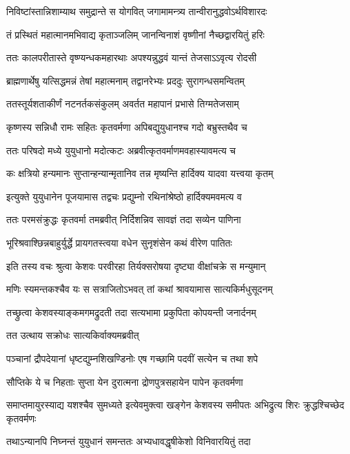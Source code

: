 \twolineshloka
{निविष्टांस्तान्निशाम्याथ समुद्रान्ते स योगवित्}
{जगामामन्त्र्य तान्वीरानुद्धवोऽर्थविशारदः}


\twolineshloka
{तं प्रस्थितं महात्मानमभिवाद्य कृताञ्जलिम्}
{जानन्विनाशं वृष्णीनां नैच्छद्वारयितुं हरिः}


\twolineshloka
{ततः कालपरीतास्ते वृष्ण्यन्धकमहारथाः}
{अपश्यन्नुद्धवं यान्तं तेजसाऽऽवृत्य रोदसी}


\twolineshloka
{ब्राह्मणार्थेषु यत्सिद्धमन्नं तेषां महात्मनाम्}
{तद्वानरेभ्यः प्रददुः सुरागन्धसमन्वितम्}


\twolineshloka
{ततस्तूर्यशताकीर्णं नटनर्तकसंकुलम्}
{अवर्तत महापानं प्रभासे तिग्मतेजसाम्}


\twolineshloka
{कृष्णस्य सन्निधौ रामः सहितः कृतवर्मणा}
{अपिबद्युयुधानश्च गदो बभ्रुस्तथैव च}


\twolineshloka
{ततः परिषदो मध्ये युयुधानो मदोत्कटः}
{अब्रवीत्कृतवर्माणमवहास्यावमत्य च}


\twolineshloka
{कः क्षत्रियो हन्यमानः सुप्तान्हन्यान्मृतानिव}
{तन्न मृष्यन्ति हार्दिक्य यादवा यत्त्वया कृतम्}


\twolineshloka
{इत्युक्ते युयुधानेन पूजयामास तद्वचः}
{प्रद्युम्नो रथिनांश्रेष्ठो हार्दिक्यमवमत्य व}


\twolineshloka
{ततः परमसंक्रुद्धः कृतवर्मा तमब्रवीत्}
{निर्दिशन्निव सावज्ञं तदा सव्येन पाणिना}


\twolineshloka
{भूरिश्रवाश्छिन्नबाहुर्युर्द्धे प्रायगतस्त्वया}
{वधेन सुनृशंसेन कथं वीरेण पातितः}


\twolineshloka
{इति तस्य वचः श्रुत्वा केशवः परवीरहा}
{तिर्यक्सरोषया दृष्ट्या वीक्षांचक्रे स मन्युमान्}


\twolineshloka
{मणिः स्यमन्तकश्चैव यः स सत्राजितोऽभवत्}
{तां कथां श्रावयामास सात्यकिर्मधुसूदनम्}


\twolineshloka
{तच्छ्रुत्वा केशवस्याङ्कमगमद्रुदती तदा}
{सत्यभामा प्रकुपिता कोपयन्ती जनार्दनम्}


\twolineshloka
{तत उत्थाय सक्रोधः सात्यकिर्वाक्यमब्रवीत्}
{}


\twolineshloka
{पञ्चानां द्रौपदेयानां धृष्टद्युम्नशिखण्डिनोः}
{एष गच्छामि पदवीं सत्येन च तथा शपे}


\twolineshloka
{सौप्तिके ये च निहताः सुप्ता येन दुरात्मना}
{द्रोणपुत्रसहायेन पापेन कृतवर्मणा}


\threelineshloka
{समाप्तमायुरस्याद्य यशश्चैव सुमध्यते}
{इत्येवमुक्त्वा खङ्गेन केशवस्य समीपतः}
{अभिद्रुत्य शिरः क्रुद्धश्चिच्छेद कृतवर्मणः}


\twolineshloka
{तथाऽन्यानपि निघ्नन्तं युयुधानं समन्ततः}
{अभ्यधावद्धृषीकेशो विनिवारयितुं तदा}


